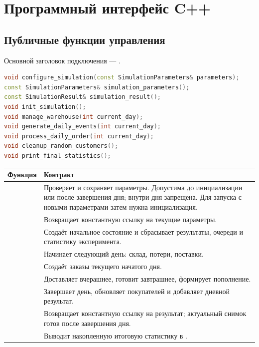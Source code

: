 \section{Программный интерфейс C++}
\label{sec:api}

\subsection{Публичные функции управления}
Основной заголовок подключения --- .
\begin{lstlisting}[language=C++]
void configure_simulation(const SimulationParameters& parameters);
const SimulationParameters& simulation_parameters();
const SimulationResult& simulation_result();
void init_simulation();
void manage_warehouse(int current_day);
void generate_daily_events(int current_day);
void process_daily_order(int current_day);
void cleanup_random_customers();
void print_final_statistics();
\end{lstlisting}

\begin{tabularx}{\textwidth}{@{}L{0.39\textwidth}Y@{}}
\toprule
Функция & Контракт \\
\midrule
{} & Проверяет и сохраняет параметры. Допустима
до инициализации или после завершения дня; внутри дня запрещена.
Для запуска с новыми параметрами затем нужна инициализация. \\
 & Возвращает константную ссылку на текущие параметры. \\
 & Создаёт начальное состояние и сбрасывает результаты,
очереди и статистику эксперимента. \\
 & Начинает следующий день: склад, потери, поставки. \\
 & Создаёт заказы текущего начатого дня. \\
 & Доставляет вчерашнее, готовит завтрашнее,
формирует пополнение. \\
 & Завершает день, обновляет покупателей
и добавляет дневной результат. \\
 & Возвращает константную ссылку на результат;
актуальный снимок готов после завершения дня. \\
 & Выводит накопленную итоговую статистику
в . \\
\bottomrule
\end{tabularx}

